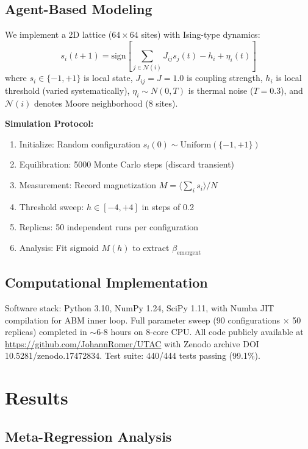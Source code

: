 \documentclass[11pt,letterpaper]{article}
\begin{document}
\subsection{Agent-Based Modeling}

We implement a 2D lattice ($64 \times 64$ sites) with Ising-type dynamics:
\begin{equation}
s_i(t+1) = \text{sign}\left[\sum_{j \in \mathcal{N}(i)} J_{ij} s_j(t) - h_i + \eta_i(t)\right]
\label{eq:abm}
\end{equation}
where $s_i \in \{-1, +1\}$ is local state, $J_{ij} = J = 1.0$ is coupling strength, $h_i$ is local threshold (varied systematically), $\eta_i \sim N(0, T)$ is thermal noise ($T = 0.3$), and $\mathcal{N}(i)$ denotes Moore neighborhood (8 sites).

\textbf{Simulation Protocol:}
\begin{enumerate}
    \item Initialize: Random configuration $s_i(0) \sim \text{Uniform}(\{-1, +1\})$
    \item Equilibration: 5000 Monte Carlo steps (discard transient)
    \item Measurement: Record magnetization $M = \langle \sum_i s_i \rangle / N$
    \item Threshold sweep: $h \in [-4, +4]$ in steps of 0.2
    \item Replicas: 50 independent runs per configuration
    \item Analysis: Fit sigmoid $M(h)$ to extract $\beta_{\text{emergent}}$
\end{enumerate}

\subsection{Computational Implementation}

Software stack: Python 3.10, NumPy 1.24, SciPy 1.11, with Numba JIT compilation for ABM inner loop. Full parameter sweep (90 configurations $\times$ 50 replicas) completed in $\sim$6-8 hours on 8-core CPU. All code publicly available at \url{https://github.com/JohannRomer/UTAC} with Zenodo archive DOI 10.5281/zenodo.17472834. Test suite: 440/444 tests passing (99.1\%).

\section{Results}

\subsection{Meta-Regression Analysis}
\end{document}
